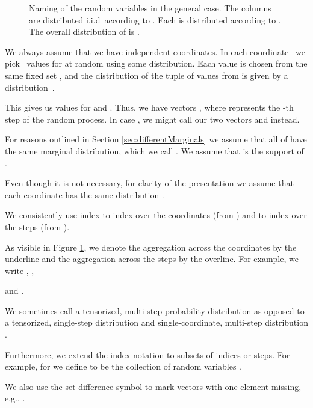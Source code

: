 \documentclass{daj}
\newcommand{\1}{\mathbbm{1}}
\theoremstyle{plain}
\theoremstyle{definition}
\begin{document}
\begin{figure}
\caption{Naming of the random variables in the general case.
The columns  are distributed i.i.d~according to
. 
Each  is distributed according to .
The overall distribution of  is
.}
\label{fig:naming}
\end{figure}

We always assume that we have  independent coordinates.
In each coordinate~
we pick~ values  for  
at random using some distribution.
Each value  is chosen from the same fixed set , and 
the distribution
of the tuple  of
values from  is given by a distribution~.

This gives us values  for  and 
.
Thus, we have  vectors
,
where 
represents the -th step of the random process. In case ,
we might call our two vectors  and  instead.

For reasons outlined in Section \ref{sec:differentMarginals} we assume that
all of  have the same marginal distribution,
which we call . We assume that  is the support of .

Even though it is not necessary,
for clarity of the presentation
we assume that each coordinate  has the 
same distribution .

\medskip

We consistently use index  to index over the coordinates 
(from )
and  to index over the steps (from ).

As visible in Figure \ref{fig:naming},
we denote the aggregation across the coordinates by the underline
and the aggregation across the steps by the overline.
For example, we write ,
, 

and .

We sometimes call  a tensorized, 
multi-step probability distribution
as opposed to a tensorized, single-step distribution 
 and single-coordinate, multi-step distribution
.

Furthermore, we extend the index notation to subsets of indices or steps.
For example, for  we define  to be the
collection of random variables .

We also use the set difference symbol to mark vectors with one element missing,
e.g., .
\end{document}
